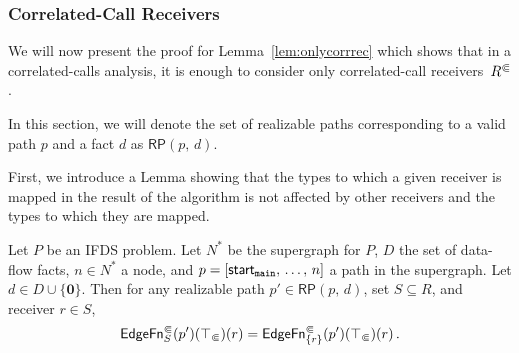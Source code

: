 \subsubsection*{Correlated-Call Receivers}
We will now present the proof for Lemma~\ref{lem:onlycorrrec} which shows that in a correlated-calls analysis, it is enough to consider only correlated-call receivers~${R^\Subset}$.

In this section, we will denote the set of realizable paths corresponding to a valid path $p$ and a fact $d$ as $\textsf{RP}(p,\,d)$.

First, we introduce a Lemma showing that the types to which a given receiver is mapped in the result of the algorithm is not affected by other receivers and the types to which they are mapped.

\begin{lemma}\label{lem:recindepedgefn}
  Let $P$ be an IFDS problem. Let $N^*$ be the supergraph for $P$, $D$ the set of data-flow facts, $n\in N^*$ a node, and $p=[\textsf{start}_\texttt{main},\,\dots,\,n]$ a path in the supergraph. Let $d\in D\cup\{\mathbf0\}$.
  Then for any realizable path $p'\in\textsf{RP}(p,\,d)$, set $S\subseteq R$, and receiver $r\in S$,
  \begin{equation}
    \textsf{EdgeFn}^\Subset_{S}(p')(\top_\Subset)(r)=
    \textsf{EdgeFn}^\Subset_{\{r\}}(p')(\top_\Subset)(r)\,.
  \end{equation}
\end{lemma}

